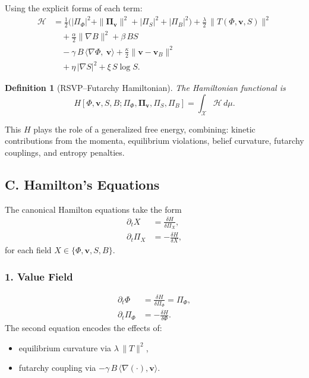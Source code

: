 \documentclass[12pt]{article}
\newtheorem{definition}{Definition}
\begin{document}
Using the explicit forms of each term:
\begin{align}
\mathcal{H}
&=
\frac{1}{2}\Big(
    |\Pi_\Phi|^2
  + \|\bm{\Pi}_{\mathbf{v}}\|^2
  + |\Pi_S|^2
  + |\Pi_B|^2
\Big)
+ \frac{\lambda}{2}\,\|T(\Phi,\mathbf{v},S)\|^2 \\[4pt]
&\quad
+ \frac{\alpha}{2}\|\nabla B\|^2
+ \beta\, B S \\[4pt]
&\quad
- \gamma\, B\,\langle \nabla \Phi,\ \mathbf{v} \rangle
+ \frac{\kappa}{2}\|\mathbf{v} - \mathbf{v}_B\|^2 \\[4pt]
&\quad
+ \eta\,|\nabla S|^2
+ \xi\, S \log S.
\end{align}

\begin{definition}[RSVP--Futarchy Hamiltonian]
The Hamiltonian functional is
\[
H[\Phi,\mathbf{v},S,B;\Pi_\Phi,\bm{\Pi}_{\mathbf{v}},\Pi_S,\Pi_B]
=
\int_{\mathcal{X}}
\mathcal{H}\, d\mu.
\]
\end{definition}

This $H$ plays the role of a generalized free energy, combining:
kinetic contributions from the momenta, equilibrium violations, belief
curvature, futarchy couplings, and entropy penalties.

\subsection*{C. Hamilton’s Equations}

The canonical Hamilton equations take the form
\begin{align}
\partial_t X
&= \frac{\delta H}{\delta \Pi_X}, \\[4pt]
\partial_t \Pi_X
&= - \frac{\delta H}{\delta X},
\end{align}
for each field $X \in \{\Phi,\mathbf{v},S,B\}$.

\subsubsection*{1. Value Field}
\begin{align}
\partial_t \Phi
&= \frac{\delta H}{\delta \Pi_\Phi}
= \Pi_\Phi, \\[4pt]
\partial_t \Pi_\Phi
&= -\frac{\delta H}{\delta \Phi}.
\end{align}
The second equation encodes the effects of:
\begin{itemize}
    \item equilibrium curvature via $\lambda\,\|T\|^2$,
    \item futarchy coupling via $-\gamma\, B\,\langle \nabla (\cdot),\mathbf{v}\rangle$.
\end{itemize}
\end{document}
